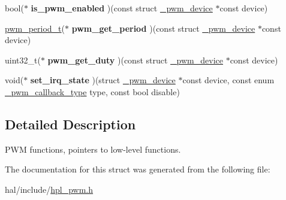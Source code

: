 \begin{DoxyCompactItemize}
\item 
\mbox{\label{struct__pwm__hpl__interface_a50b9c5366dab2b53e13b9cbbf1e4430c}} 
bool($\ast$ {\bfseries is\+\_\+pwm\+\_\+enabled} )(const struct \hyperlink{struct__pwm__device}{\+\_\+pwm\+\_\+device} $\ast$const device)
\item 
\mbox{\label{struct__pwm__hpl__interface_a59aceb97fe2d40e082902316f76a12d3}} 
\hyperlink{group___h_p_l_ga54b3c18a071fea0c56652e887810b3f6}{pwm\+\_\+period\+\_\+t}($\ast$ {\bfseries pwm\+\_\+get\+\_\+period} )(const struct \hyperlink{struct__pwm__device}{\+\_\+pwm\+\_\+device} $\ast$const device)
\item 
\mbox{\label{struct__pwm__hpl__interface_a9e5008d4274c994de965aa87af01fdfc}} 
uint32\+\_\+t($\ast$ {\bfseries pwm\+\_\+get\+\_\+duty} )(const struct \hyperlink{struct__pwm__device}{\+\_\+pwm\+\_\+device} $\ast$const device)
\item 
\mbox{\label{struct__pwm__hpl__interface_ab07f8c7524d8c1e57a849fef6a03ee93}} 
void($\ast$ {\bfseries set\+\_\+irq\+\_\+state} )(struct \hyperlink{struct__pwm__device}{\+\_\+pwm\+\_\+device} $\ast$const device, const enum \hyperlink{group___h_p_l_gaa279abe5a858ccbaea89be01192a2d6c}{\+\_\+pwm\+\_\+callback\+\_\+type} type, const bool disable)
\end{DoxyCompactItemize}


\subsection{Detailed Description}
P\+WM functions, pointers to low-\/level functions. 

The documentation for this struct was generated from the following file\+:\begin{DoxyCompactItemize}
\item 
hal/include/\hyperlink{hpl__pwm_8h}{hpl\+\_\+pwm.\+h}\end{DoxyCompactItemize}
